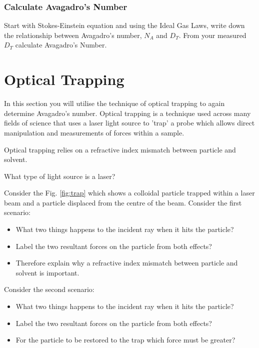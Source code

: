 \documentclass[12pt,a4paper,twoside]{article}
\begin{document}
\subsubsection{Calculate Avagadro's Number}

Start with Stokes-Einstein equation and using the Ideal Gas Laws, write down the relationship between Avagadro's number, $N_A$ and $D_T$. From your measured $D_T$ calculate Avagadro's Number. 


\newpage
\section{Optical Trapping}

In this section you will utilise the technique of optical trapping to again determine Avagadro's number. Optical trapping is a technique used across many fields of science that uses a laser light source to 'trap' a probe which allows direct manipulation and measurements of forces within a sample.

Optical trapping relies on a refractive index mismatch between particle and solvent.

What type of light source is a laser?
\vspace{2cm} 

Consider the Fig. \ref{fig:trap} which shows a colloidal particle trapped within a laser beam and a particle displaced from the centre of the beam.
Consider the first scenario:
\begin{itemize}
	\item What two things happens to the incident ray when it hits the particle?
	\vspace{2cm}
	\item Label the two resultant forces on the particle from both effects?
	\vspace{2cm}
	\item Therefore explain why a refractive index mismatch between particle and solvent is important.
	\vspace{2cm}
\end{itemize}

Consider the second scenario:
\begin{itemize}
	\item What two things happens to the incident ray when it hits the particle?
	\vspace{2cm}
	\item Label the two resultant forces on the particle from both effects?
	\vspace{2cm}
	\item For the particle to be restored to the trap which force must be greater?
\end{itemize}
\end{document}
